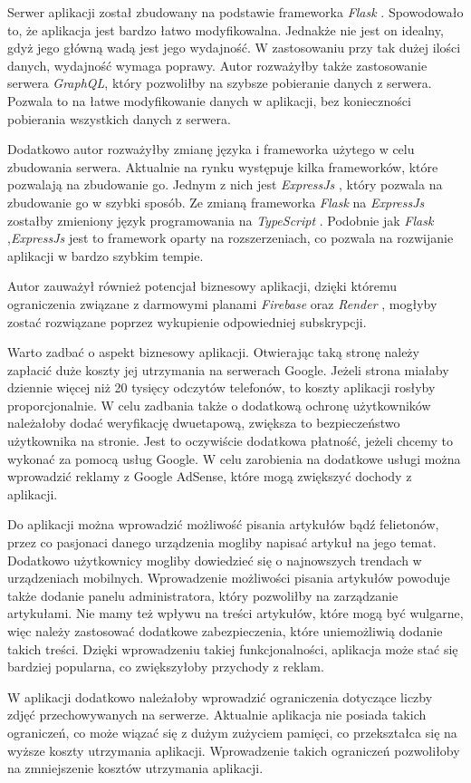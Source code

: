 Serwer aplikacji został zbudowany na podstawie frameworka \textit{Flask} \cite{flask}. Spowodowało to, że aplikacja jest bardzo łatwo modyfikowalna. Jednakże nie jest on idealny, gdyż jego główną wadą jest jego wydajność. W zastosowaniu przy tak dużej ilości danych, wydajność wymaga poprawy. Autor rozważyłby także zastosowanie serwera \textit{GraphQL}, który pozwoliłby na szybsze pobieranie danych z serwera. Pozwala to na łatwe modyfikowanie danych w aplikacji, bez konieczności pobierania wszystkich danych z serwera.

Dodatkowo autor rozważyłby zmianę języka i frameworka użytego w celu zbudowania serwera. Aktualnie na rynku występuje kilka frameworków, które pozwalają na zbudowanie go. Jednym z nich jest \textit{ExpressJs} \cite{express}, który pozwala na zbudowanie go w szybki sposób. Ze zmianą frameworka \textit{Flask} na \textit{ExpressJs} \cite{express} zostałby zmieniony język programowania na \textit{TypeScript} \cite{TypeScript}. Podobnie jak \textit{Flask} \cite{flask},\linebreak \textit{ExpressJs} \cite{express} jest to framework oparty na rozszerzeniach, co pozwala na rozwijanie aplikacji w bardzo szybkim tempie.

Autor zauważył również potencjał biznesowy aplikacji, dzięki któremu ograniczenia związane z darmowymi planami \textit{Firebase} \cite{firebase} oraz \textit{Render} \cite{render}, mogłyby zostać rozwiązane poprzez wykupienie odpowiedniej subskrypcji.

Warto zadbać o aspekt biznesowy aplikacji. Otwierając taką stronę należy zapłacić duże koszty jej utrzymania na serwerach Google. Jeżeli strona miałaby dziennie więcej niż 20 tysięcy odczytów telefonów, to koszty aplikacji rosłyby proporcjonalnie. W celu zadbania także o dodatkową ochronę użytkowników należałoby dodać weryfikację dwuetapową, zwiększa to bezpieczeństwo użytkownika na stronie. Jest to oczywiście dodatkowa płatność, jeżeli chcemy to wykonać za pomocą usług Google. W celu zarobienia na dodatkowe usługi można wprowadzić reklamy z Google AdSense, które mogą zwiększyć dochody z aplikacji.

Do aplikacji można wprowadzić możliwość pisania artykułów bądź felietonów, przez co pasjonaci danego urządzenia mogliby napisać artykuł na jego temat. Dodatkowo użytkownicy mogliby dowiedzieć się o najnowszych trendach w urządzeniach mobilnych. Wprowadzenie możliwości pisania artykułów powoduje także dodanie panelu administratora, który pozwoliłby na zarządzanie artykułami. Nie mamy też wpływu na treści artykułów, które mogą być wulgarne, więc należy zastosować dodatkowe zabezpieczenia, które uniemożliwią dodanie takich treści. Dzięki wprowadzeniu takiej funkcjonalności, aplikacja może stać się bardziej popularna, co zwiększyłoby przychody z reklam.

W aplikacji dodatkowo należałoby wprowadzić ograniczenia dotyczące liczby zdjęć przechowywanych na serwerze. Aktualnie aplikacja nie posiada takich ograniczeń, co może wiązać się z dużym zużyciem pamięci, co przekształca się na wyższe koszty utrzymania aplikacji. Wprowadzenie takich ograniczeń pozwoliłoby na zmniejszenie kosztów utrzymania aplikacji.
